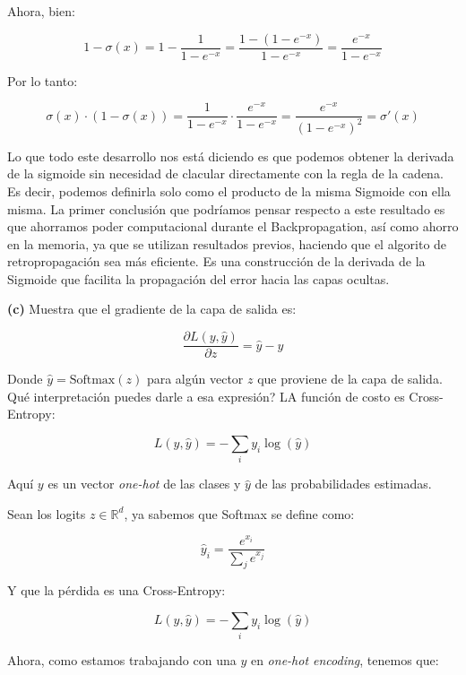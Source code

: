 Ahora, bien:

\[
    1 - \sigma(x) = 1 - \frac{1}{1 - e^{-x}} = \frac{1 - (1- e^{-x})}{1 - e^{-x}} = \frac{e^{-x}}{1 - e^{-x}}
\]

Por lo tanto: 

\[
    \boxed{\sigma(x) \cdot (1 - \sigma(x)) = \frac{1}{1 - e^{-x}} \cdot \frac{e^{-x}}{1 - e^{-x}} = \frac{e^{-x}}{(1 - e^{-x})^2} = \sigma'(x)}
\]

Lo que todo este desarrollo nos está diciendo es que podemos obtener la derivada de la sigmoide sin necesidad de clacular
directamente con la regla de la cadena. Es decir, podemos definirla solo como el producto de la misma 
Sigmoide con ella misma. La primer conclusión que podríamos pensar respecto a este resultado es que ahorramos
poder computacional durante el Backpropagation, así como ahorro en la memoria, ya que se utilizan resultados previos,
haciendo que el algorito de retropropagación sea más eficiente. Es una construcción de la derivada de la 
Sigmoide que facilita la propagación del error hacia las capas ocultas. 


\begin{myblock}
    
    \textbf{(c)} Muestra que el gradiente de la capa de salida es:

    \[
        \frac{\partial L(y, \hat{y})}{\partial z} = \hat{y} - y
    \]

    Donde $\hat{y} = \text{Softmax}(z)$ para algún vector $z$ que proviene de la capa de salida. Qué interpretación
    puedes darle a esa expresión? LA función de costo es Cross-Entropy:

    \[
        L(y, \hat{y}) = - \sum_i y_i \log(\hat{y})
    \]

    Aquí $y$ es un vector \textit{one-hot} de las clases y $\hat{y}$ de las probabilidades estimadas. 
\end{myblock}

Sean los logits $z \in \mathbb{R}^d$, ya sabemos que Softmax se define como:

\[
    \hat{y}_i = \frac{e^{x_i}}{\sum_{j} e^{x_j}}
\]

Y que la pérdida es una Cross-Entropy:

\[
    L(y, \hat{y}) = - \sum_i y_i \log(\hat{y})
\]

Ahora, como estamos trabajando con una $y$ en \textit{one-hot encoding}, tenemos que:


